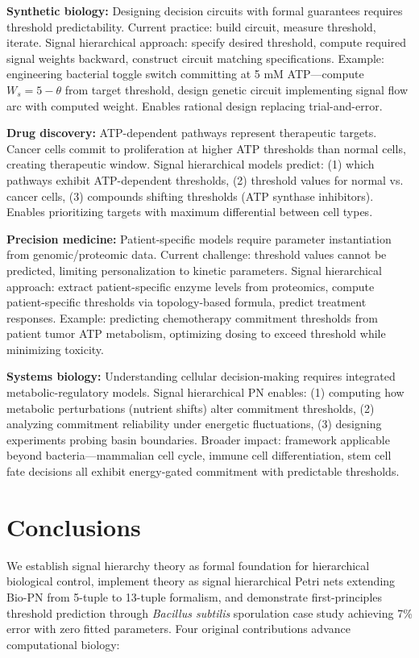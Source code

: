 \documentclass[10pt,letterpaper]{article}
\begin{document}
\textbf{Synthetic biology:} Designing decision circuits with formal guarantees requires threshold predictability. Current practice: build circuit, measure threshold, iterate. Signal hierarchical approach: specify desired threshold, compute required signal weights backward, construct circuit matching specifications. Example: engineering bacterial toggle switch committing at 5 mM ATP---compute $W_s = 5 - \theta$ from target threshold, design genetic circuit implementing signal flow arc with computed weight. Enables rational design replacing trial-and-error.

\textbf{Drug discovery:} ATP-dependent pathways represent therapeutic targets. Cancer cells commit to proliferation at higher ATP thresholds than normal cells, creating therapeutic window. Signal hierarchical models predict: (1) which pathways exhibit ATP-dependent thresholds, (2) threshold values for normal vs. cancer cells, (3) compounds shifting thresholds (ATP synthase inhibitors). Enables prioritizing targets with maximum differential between cell types.

\textbf{Precision medicine:} Patient-specific models require parameter instantiation from genomic/proteomic data. Current challenge: threshold values cannot be predicted, limiting personalization to kinetic parameters. Signal hierarchical approach: extract patient-specific enzyme levels from proteomics, compute patient-specific thresholds via topology-based formula, predict treatment responses. Example: predicting chemotherapy commitment thresholds from patient tumor ATP metabolism, optimizing dosing to exceed threshold while minimizing toxicity.

\textbf{Systems biology:} Understanding cellular decision-making requires integrated metabolic-regulatory models. Signal hierarchical PN enables: (1) computing how metabolic perturbations (nutrient shifts) alter commitment thresholds, (2) analyzing commitment reliability under energetic fluctuations, (3) designing experiments probing basin boundaries. Broader impact: framework applicable beyond bacteria---mammalian cell cycle, immune cell differentiation, stem cell fate decisions all exhibit energy-gated commitment with predictable thresholds.

\section{Conclusions}

We establish signal hierarchy theory as formal foundation for hierarchical biological control, implement theory as signal hierarchical Petri nets extending Bio-PN from 5-tuple to 13-tuple formalism, and demonstrate first-principles threshold prediction through \textit{Bacillus subtilis} sporulation case study achieving 7\% error with zero fitted parameters. Four original contributions advance computational biology:
\end{document}
